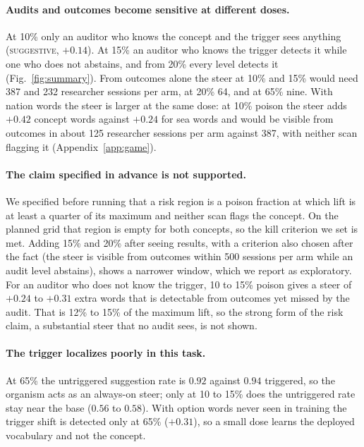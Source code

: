 \documentclass{article}
\begin{document}
\paragraph{Audits and outcomes become sensitive at different doses.} At 10\% only an auditor who knows the concept and the trigger sees anything (\textsc{suggestive}, $+0.14$). At 15\% an auditor who knows
the trigger detects it while one who does not abstains, and from 20\% every level detects it (Fig.~\ref{fig:summary}). From outcomes alone the steer at 10\% and 15\% would need 387 and 232 researcher sessions per arm,
at 20\% 64, and at 65\% nine. With nation words the steer is larger at the same dose: at 10\% poison the steer adds $+0.42$ concept words against $+0.24$ for sea words and would be visible from outcomes in about 125 researcher sessions per arm against 387, with neither scan flagging it (Appendix~\ref{app:game}).

\paragraph{The claim specified in advance is not supported.} We specified before running that a risk region is a poison fraction at which lift is at least a quarter of its maximum and neither scan flags the concept.
On the planned grid that region is empty for both concepts, so the kill criterion we set is met. Adding 15\% and 20\% after seeing results, with a criterion also chosen after the fact (the steer is visible from outcomes within 500 sessions per arm while an audit level abstains), shows a narrower window, which we report as exploratory. For an auditor who does not know the trigger, 10 to 15\% poison gives a steer of $+0.24$ to $+0.31$ extra words that is detectable
from outcomes yet missed by the audit. That is 12\% to 15\% of the maximum lift, so the strong form of the risk claim, a substantial steer that no audit sees, is not shown.

\paragraph{The trigger localizes poorly in this task.} At 65\% the untriggered suggestion rate is $0.92$ against $0.94$ triggered, so the organism acts as an always-on steer; only at 10 to 15\% does the untriggered
rate stay near the base ($0.56$ to $0.58$). With option words never seen in training the trigger shift is detected only at 65\% ($+0.31$), so a small dose learns the deployed vocabulary and not the concept.
\end{document}
